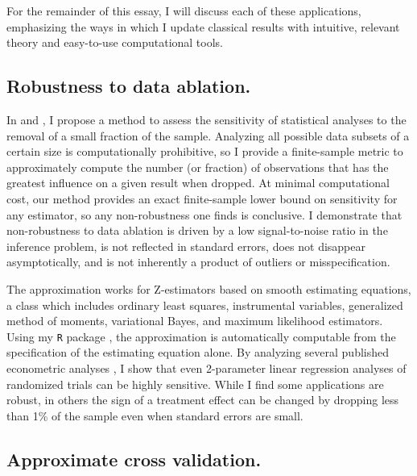 For the remainder of this essay, I will discuss each of these applications,
emphasizing the ways in which I update classical results with intuitive,
relevant theory and easy-to-use computational tools.

\newpage



\subsection*{Robustness to data ablation.}

In \citet{zaminfluence} and \citet{giordano:2020:amip}, I propose a method to
assess the sensitivity of statistical analyses to the removal of a small
fraction of the sample. Analyzing all possible data subsets of a certain size is
computationally prohibitive, so I provide a finite-sample metric to
approximately compute the number (or fraction) of observations that has the
greatest influence on a given result when dropped.  At minimal computational
cost, our method provides an exact finite-sample lower bound on sensitivity for
any estimator, so any non-robustness one finds is conclusive. I demonstrate that
non-robustness to data ablation is driven by a low signal-to-noise ratio in the
inference problem, is not reflected in standard errors, does not disappear
asymptotically, and is not inherently a product of outliers or misspecification.

The approximation works for Z-estimators based on smooth estimating equations, a
class which includes ordinary least squares, instrumental variables, generalized
method of moments, variational Bayes, and maximum likelihood estimators. Using
my \texttt{R} package \citep{zaminfluence}, the approximation is automatically
computable from the specification of the estimating equation alone.  By
analyzing several published econometric analyses \citep{angelucci:2009:indirect,
finkelstein:2012:oregon, meager:2019:microcredit}, I show that even 2-parameter
linear regression analyses of randomized trials can be highly sensitive.  While
I find some applications are robust, in others the sign of a treatment effect
can be changed by dropping less than 1\% of the sample even when standard errors
are small.


\subsection*{Approximate cross validation.}

